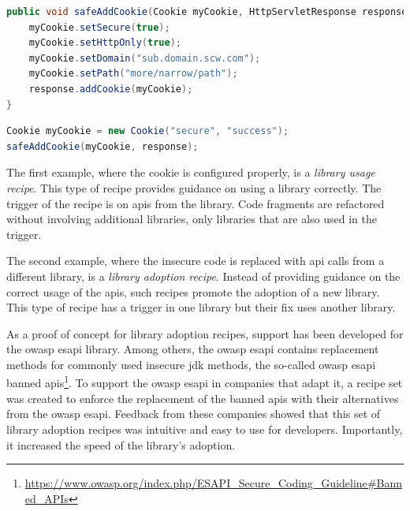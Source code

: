 \begin{lstlisting}[language={Java},caption={A wrapper library can be created to avoid code reuse and to improve clarity of the guidelines for the developer.}, float,label={lst:cookie3},abovecaptionskip=-0.0pt] 
public void safeAddCookie(Cookie myCookie, HttpServletResponse response){
    myCookie.setSecure(true);
    myCookie.setHttpOnly(true);
    myCookie.setDomain("sub.domain.scw.com");
    myCookie.setPath("more/narrow/path");
    response.addCookie(myCookie);
}
\end{lstlisting}

\begin{lstlisting}[language={Java},caption={Migrating to the wrapper library consists of replacing the original methodcall with one from the library.},float,label={lst:cookie4},abovecaptionskip=-0.0pt]
Cookie myCookie = new Cookie("secure", "success");
safeAddCookie(myCookie, response);
\end{lstlisting}

The first example, where the cookie is configured properly, is a \emph{library usage recipe}.
This type of recipe provides guidance on using a library correctly.
The trigger of the recipe is on \glspl{api} from the library.
Code fragments are refactored without involving additional libraries, only libraries that are also used in the trigger.

The second example, where the insecure code is replaced with \gls{api} calls from a different library, is a \emph{library adoption recipe}.
Instead of providing guidance on the correct usage of the \glspl{api}, such recipes promote the adoption of a new library.
This type of recipe has a trigger in one library but their fix uses another library.

As a proof of concept for library adoption recipes, support has been developed for the \gls{owasp} \gls{esapi} library.
Among others, the \gls{owasp} \gls{esapi} contains replacement methods for commonly used insecure \gls{jdk} methods, the so-called \gls{owasp} \gls{esapi} banned \glspl{api}\footnote{\url{https://www.owasp.org/index.php/ESAPI\_Secure\_Coding\_Guideline\#Banned_APIs}}.
To support the \gls{owasp} \gls{esapi} in companies that adapt it, a recipe set was created to enforce the replacement of the banned \glspl{api} with their alternatives from the \gls{owasp} \gls{esapi}.
Feedback from these companies showed that this set of library adoption recipes was intuitive and easy to use for developers.
Importantly, it increased the speed of the library's adoption.

